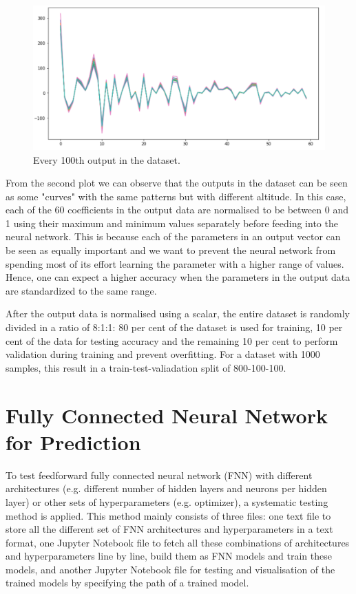 \begin{figure}[H]
    \caption{Every 100th output in the dataset.}
    \includegraphics[scale=0.6]{figures/geoid_images/Geoid_sample_output.png}
\end{figure}

From the second plot we can observe that the outputs in the dataset can be seen as some "curves" with the same patterns but with different altitude. In this case, each of the 60 coefficients in the output data are normalised to be between 0 and 1 using their maximum and minimum values separately before feeding into the neural network. This is because each of the parameters in an output vector can be seen as equally important and we want to prevent the neural network from spending most of its effort learning the parameter with a higher range of values. Hence, one can expect a higher accuracy when the parameters in the output data are standardized to the same range.

After the output data is normalised using a scalar, the entire dataset is randomly divided in a ratio of 8:1:1: 80 per cent of the dataset is used for training, 10 per cent of the data for testing accuracy and the remaining 10 per cent to perform validation during training and prevent overfitting. For a dataset with 1000 samples, this result in a train-test-valiadation split of 800-100-100.


\section{Fully Connected Neural Network for Prediction}

To test feedforward fully connected neural network (FNN) with different architectures (e.g. different number of hidden layers and neurons per hidden layer) or other sets of hyperparameters (e.g. optimizer), a systematic testing method is applied. This method mainly consists of three files: one text file to store all the different set of FNN architectures and hyperparameters in a text format, one Jupyter Notebook file to fetch all these combinations of architectures and hyperparameters line by line, build them as FNN models and train these models, and another Jupyter Notebook file for testing and visualisation of the trained models by specifying the path of a trained model.

